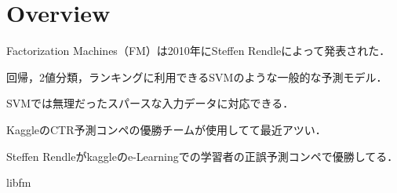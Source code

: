 \section{Overview}
Factorization Machines（FM）は2010年にSteffen Rendleによって発表された\cite{Rendle:2010:FM:1933307.1934620}．

回帰，2値分類，ランキングに利用できるSVMのような一般的な予測モデル．

SVMでは無理だったスパースな入力データに対応できる．

KaggleのCTR予測コンペの優勝チームが使用してて最近アツい．

Steffen Rendleがkaggleのe-Learningでの学習者の正誤予測コンペで優勝してる．

libfm
